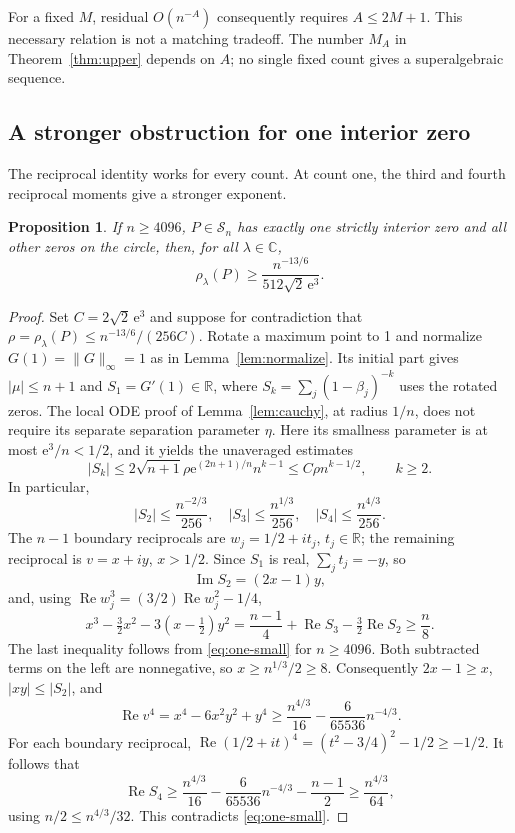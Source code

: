 \documentclass[11pt]{article}
\newtheorem{proposition}[theorem]{Proposition}
\theoremstyle{remark}\newtheorem{remark}[theorem]{Remark}
\newcommand{\C}{\mathbb C}
\newcommand{\norm}[1]{\lVert #1\rVert}
\newcommand{\Rea}{\operatorname{Re}}
\newcommand{\ee}{\mathrm e}
\begin{document}
For a fixed \(M\), residual \(O(n^{-A})\) consequently requires
\(A\le2M+1\). This necessary relation is not a matching tradeoff.
The number \(M_A\) in Theorem~\ref{thm:upper} depends on \(A\);
no single fixed count gives a superalgebraic sequence.

\subsection{A stronger obstruction for one interior zero}
The reciprocal identity works for every count. At count one, the
third and fourth reciprocal moments give a stronger exponent.

\begin{proposition}\label{prop:one-lower}
If \(n\ge4096\), \(P\in\mathcal S_n\) has exactly one strictly
interior zero and all other zeros on the circle, then, for all
\(\lambda\in\C\),
\[
 \rho_\lambda(P)\ge\frac{n^{-13/6}}{512\sqrt2\,\ee^3}.
\]
\end{proposition}
\begin{proof}
Set \(C=2\sqrt2\,\ee^3\) and suppose for contradiction that
\(\rho=\rho_\lambda(P)\le n^{-13/6}/(256C)\).
Rotate a maximum point to 1 and normalize \(G(1)=\norm G_\infty=1\)
as in Lemma~\ref{lem:normalize}. Its initial part gives
\(|\mu|\le n+1\) and \(S_1=G'(1)\in\mathbb R\), where
\(S_k=\sum_j(1-\beta_j)^{-k}\) uses the rotated zeros.
The local ODE proof of Lemma~\ref{lem:cauchy}, at radius \(1/n\),
does not require its separate separation parameter \(\eta\).
Here its smallness parameter is at most \(\ee^3/n<1/2\), and
it yields the unaveraged estimates
\[
 |S_k|\le2\sqrt{n+1}\rho\ee^{(2n+1)/n}n^{k-1}
       \le C\rho n^{k-1/2},\qquad k\ge2.
\]
In particular,
\begin{equation}\label{eq:one-small}
 |S_2|\le\frac{n^{-2/3}}{256},\quad
 |S_3|\le\frac{n^{1/3}}{256},\quad
 |S_4|\le\frac{n^{4/3}}{256}.
\end{equation}
The \(n-1\) boundary reciprocals are \(w_j=1/2+it_j\),
\(t_j\in\mathbb R\); the remaining reciprocal is \(v=x+iy\),
\(x>1/2\). Since \(S_1\) is real, \(\sum_jt_j=-y\), so
\[
 \operatorname{Im}S_2=(2x-1)y,
\]
and, using \(\Rea w_j^3=(3/2)\Rea w_j^2-1/4\),
\[
 x^3-\tfrac32x^2-3(x-\tfrac12)y^2
   =\frac{n-1}{4}+\Rea S_3-\tfrac32\Rea S_2\ge\frac n8.
\]
The last inequality follows from \eqref{eq:one-small} for
\(n\ge4096\). Both subtracted terms on the left are nonnegative,
so \(x\ge n^{1/3}/2\ge8\). Consequently
\(2x-1\ge x\), \(|xy|\le|S_2|\), and
\[
 \Rea v^4=x^4-6x^2y^2+y^4
 \ge\frac{n^{4/3}}{16}-\frac6{65536}n^{-4/3}.
\]
For each boundary reciprocal,
\(\Rea(1/2+it)^4=(t^2-3/4)^2-1/2\ge-1/2\).
It follows that
\[
 \Rea S_4\ge\frac{n^{4/3}}{16}
              -\frac6{65536}n^{-4/3}-\frac{n-1}{2}
            \ge\frac{n^{4/3}}{64},
\]
using \(n/2\le n^{4/3}/32\). This contradicts
\eqref{eq:one-small}.
\end{proof}
\end{document}
